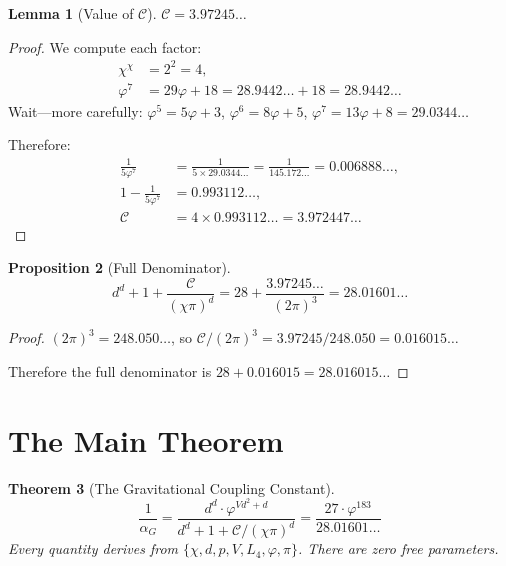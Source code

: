 \documentclass[11pt,a4paper]{article}
\theoremstyle{plain}
\newtheorem{theorem}{Theorem}[section]
\newtheorem{lemma}[theorem]{Lemma}
\newtheorem{proposition}[theorem]{Proposition}
\theoremstyle{definition}
\newcommand{\vp}{\varphi}
\begin{document}
\begin{lemma}[Value of $\mathcal{C}$]\label{lem:C}
$\mathcal{C} = 3.97245\ldots$
\end{lemma}

\begin{proof}
We compute each factor:
\begin{align*}
  \chi^\chi &= 2^2 = 4, \\
  \vp^7 &= 29\vp + 18 = 28.9442\ldots + 18 = 28.9442\ldots
\end{align*}
Wait---more carefully:
$\vp^5 = 5\vp + 3$, $\vp^6 = 8\vp + 5$, $\vp^7 = 13\vp + 8 = 29.0344\ldots$

Therefore:
\begin{align*}
  \frac{1}{5\vp^7} &= \frac{1}{5 \times 29.0344\ldots}
                     = \frac{1}{145.172\ldots}
                     = 0.006888\ldots, \\
  1 - \frac{1}{5\vp^7} &= 0.993112\ldots, \\
  \mathcal{C} &= 4 \times 0.993112\ldots = 3.972447\ldots
\end{align*}
\end{proof}

\begin{proposition}[Full Denominator]\label{prop:full-denom}
\[
  d^d + 1 + \frac{\mathcal{C}}{(\chi\pi)^d}
  = 28 + \frac{3.97245\ldots}{(2\pi)^3}
  = 28.01601\ldots
\]
\end{proposition}

\begin{proof}
$(2\pi)^3 = 248.050\ldots$, so
$\mathcal{C}/(2\pi)^3 = 3.97245/248.050 = 0.016015\ldots$

Therefore the full denominator is $28 + 0.016015 = 28.016015\ldots$
\end{proof}

\section{The Main Theorem}\label{sec:main}

\begin{theorem}[The Gravitational Coupling Constant]\label{thm:main}
\[
  \boxed{\;
    \frac{1}{\alpha_G}
    = \frac{d^d \cdot \vp^{Vd^2+d}}
           {d^d + 1 + \mathcal{C}/(\chi\pi)^d}
    = \frac{27 \cdot \vp^{183}}{28.01601\ldots}
  \;}
\]
Every quantity derives from $\{\chi, d, p, V, L_4, \vp, \pi\}$.
There are zero free parameters.
\end{theorem}
\end{document}
